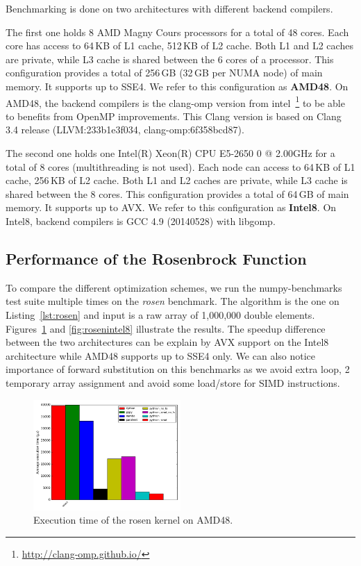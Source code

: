 \documentclass[10pt, preprint]{sigplanconf}
\begin{document}
Benchmarking is done on two architectures with different backend compilers.

The first one holds 8 AMD Magny Cours processors for a
total of 48 cores. Each core has access to 64\,KB of L1 cache,
512\,KB of L2 cache. Both L1 and L2 caches are private, while L3 cache
is shared between the 6 cores of a processor. This configuration
provides a total of 256\,GB (32\,GB per NUMA node) of main memory. It supports
up to SSE4. We refer to this configuration as \textbf{AMD48}.
On AMD48, the backend compilers is the clang-omp
version from intel~\footnote{\url{http://clang-omp.github.io/}} to be able to
benefits from OpenMP improvements. This Clang version is based on Clang 3.4
release (LLVM:233b1e3f034, clang-omp:6f358bcd87).

The second one holds one Intel(R) Xeon(R) CPU E5-2650 0 @ 2.00GHz for a total of
8 cores (multithreading is not used). Each node can access to 64\,KB of L1
cache, 256\,KB of L2 cache. Both L1 and L2 caches are private, while L3 cache
is shared between the 8 cores. This configuration provides a total of 64\,GB of 
main memory. It supports up to AVX. We refer to this configuration as
\textbf{Intel8}.
On Intel8, backend compilers is GCC 4.9 (20140528) with libgomp.


\subsection{Performance of the Rosenbrock Function}

To compare the different optimization schemes, we run the numpy-benchmarks test
suite multiple times on the \textit{rosen} benchmark. The algorithm is the one
on Listing~\ref{lst:rosen} and input is a raw array of 1,000,000 double elements.
Figures~\ref{fig:rosenamd48} and \ref{fig:rosenintel8} illustrate the results.
The speedup difference between the two architectures can be explain by AVX support on
the Intel8 architecture while AMD48 supports up to SSE4 only.
We can also notice importance of forward substitution on this benchmarks as
we avoid extra loop, 2 temporary array assignment and avoid some load/store for
SIMD instructions.

\begin{figure}[t]
\centering
\includegraphics[width=0.5\textwidth]{rosen_amd48.png}
\caption{Execution time of the rosen kernel on AMD48.}
\label{fig:rosenamd48}
\end{figure}
\end{document}
